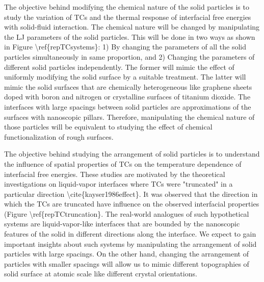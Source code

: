 \par The objective behind modifying the chemical nature of the solid particles is to study the variation of TCs and the thermal response of interfacial free energies with solid-fluid interaction. The chemical nature will be changed by manipulating the LJ parameters of the solid particles. This will be done in two ways as shown in Figure \textbackslash ref\{repTCsystems\}: 1) By changing the parameters of all the solid particles simultaneously in same proportion, and 2) Changing the parameters of different solid particles independently. The former will  mimic the effect of uniformly modifying the solid surface by a suitable treatment. The latter will mimic the solid surfaces that are chemically heterogeneous like graphene sheets doped with boron and nitrogen or crystalline surfaces of titanium dioxide. The interfaces with large spacings between solid particles are approximations of the surfaces with nanoscopic pillars. Therefore, manipulating the chemical nature of those particles will be equivalent to studying the effect of chemical functionalization of rough surfaces.
\par The objective behind studying the arrangement of solid particles is to understand the influence of spatial properties of TCs on the temperature dependence of interfacial free energies. These studies are motivated by the theoretical investigations on liquid-vapor interfaces where TCs were "truncated" in a particular direction \textbackslash cite\{kayser1986effect\}. It was observed that the direction in which the TCs are truncated have influence on the observed interfacial properties (Figure \textbackslash ref\{repTCtruncation\}. The real-world analogues of such hypothetical systems are liquid-vapor-like interfaces that are bounded by the nanoscopic features of the solid in different directions along the interface.  We expect to gain important insights about such systems by manipulating the arrangement of solid particles with large spacings. On the other hand, changing the arrangement of particles with smaller spacings will allow us to mimic different topographies of solid surface at atomic scale like different crystal orientations.
